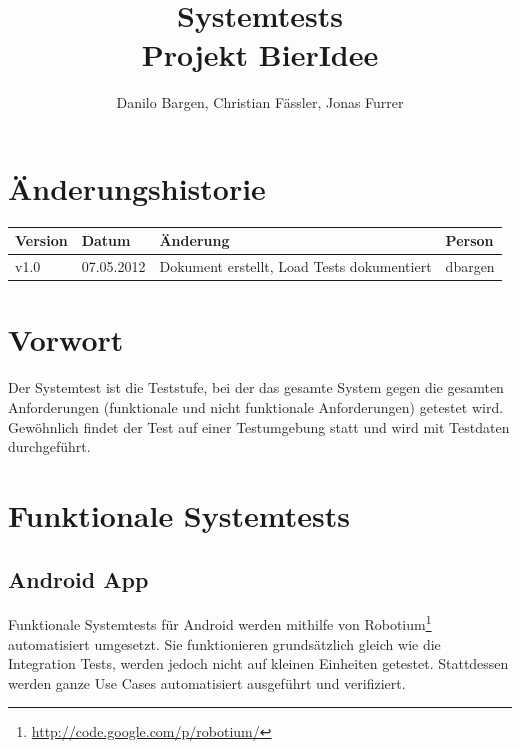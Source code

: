 \documentclass[10pt,a4paper]{scrartcl}
\author{Danilo Bargen, Christian Fässler, Jonas Furrer}
\title{Systemtests\\Projekt BierIdee}
\begin{document}
\begin{titlepage}
	\maketitle
	\vspace{120mm}
	\thispagestyle{empty} %
\end{titlepage}

\tableofcontents
\newpage

\section*{Änderungshistorie}
\begin{tabular}{p{}p{}p{}p{}}
\toprule
\textbf{Version} & \textbf{Datum} & \textbf{Änderung} & \textbf{Person} \\  
\midrule
v1.0 & 07.05.2012 & Dokument erstellt, Load Tests dokumentiert & dbargen \\  
\hline 
\bottomrule
\end{tabular} 
\newpage

\section{Vorwort}

Der Systemtest ist die Teststufe, bei der das gesamte System gegen die gesamten Anforderungen
(funktionale und nicht funktionale Anforderungen) getestet wird. Gewöhnlich findet der Test auf
einer Testumgebung statt und wird mit Testdaten durchgeführt.


\section{Funktionale Systemtests}

\subsection{Android App}

Funktionale Systemtests für Android werden mithilfe von
Robotium\footnote{\url{http://code.google.com/p/robotium/}} automatisiert umgesetzt. Sie
funktionieren grundsätzlich gleich wie die Integration Tests, werden jedoch nicht auf kleinen
Einheiten getestet. Stattdessen werden ganze Use Cases automatisiert ausgeführt und verifiziert.
\end{document}
